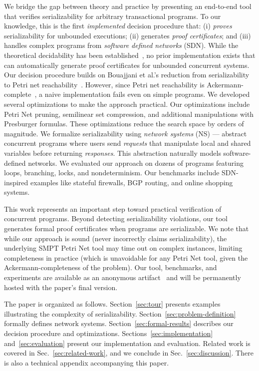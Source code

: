 We bridge the gap between theory and practice by presenting an end-to-end tool that verifies serializability for arbitrary transactional programs.
To our knowledge, this is the first \emph{implemented} decision procedure that: (i) \textit{proves} serializability for unbounded executions; (ii) generates \textit{proof certificates}; and (iii) handles complex programs from \textit{software defined networks} (SDN).
While the theoretical decidability has been established~\cite{BoEmEnHa13}, no prior implementation exists that can automatically generate proof certificates for unbounded concurrent systems.
%
Our decision procedure builds on Bouajjani et al.'s reduction from serializability to Petri net reachability~\cite{BoEmEnHa13}. However, since Petri net reachability is Ackermann-complete~\cite{CzWo22}, a naive implementation fails even on simple programs. We developed several optimizations to make the approach practical. 
Our optimizations include Petri Net pruning, semilinear set compression, and additional manipulations with Presburger formulas.
These optimizations reduce the search space by orders of magnitude.
%
We formalize serializability using \textit{network systems} (NS) --- abstract concurrent programs where users send \textit{requests} that manipulate local and shared variables before returning \textit{responses}. This abstraction naturally models software-defined networks.
We evaluated our approach on dozens of programs featuring loops, branching, locks, and nondeterminism. Our benchmarks include SDN-inspired examples like stateful firewalls, BGP routing, and online shopping systems.


This work represents an important step toward practical verification of concurrent programs.
Beyond detecting serializability violations, our tool generates formal proof certificates when programs are serializable.
We note that while our approach is sound (never incorrectly claims serializability), the underlying SMPT Petri Net tool may time out on complex instances, limiting completeness in practice (which is unavoidable for any Petri Net tool, given the Ackermann-completeness of the problem).
Our tool, benchmarks, and experiments are available as an anonymous artifact~\cite{ArtifactRepository} and will be permanently hosted with the paper’s final version.

The paper is organized as follows. Section~\ref{sec:tour} presents examples illustrating the complexity of serializability. Section~\ref{sec:problem-definition} formally defines network systems. Section~\ref{sec:formal-results} describes our decision procedure and optimizations. Sections~\ref{sec:implementation} and~\ref{sec:evaluation} present our implementation and evaluation. 
Related work is covered in Sec.~\ref{sec:related-work}, and we conclude in Sec.~\ref{sec:discussion}.
%
There is also a technical appendix accompanying this paper.





